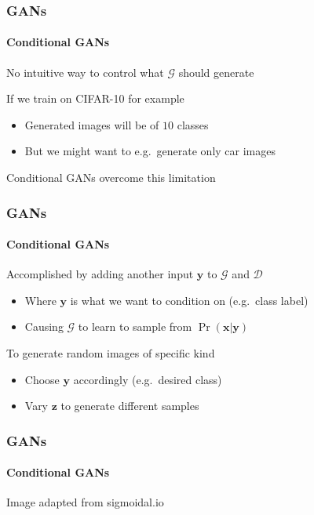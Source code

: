 \documentclass[xetex,professionalfont]{beamer}
\renewcommand\emph[1]{\textcolor{tuwcvl_cvl_blue}{#1}}
\renewcommand{\vec}[1]{\ensuremath{\mathbf{#1}}}
\newcommand{\vx}{\vec{x}}
\newcommand{\vy}{\vec{y}}
\newcommand{\vz}{\vec{z}}
\newcommand{\cD}{\mathcal{D}}
\newcommand{\cG}{\mathcal{G}}
\begin{document}
\begin{frame}
	\frametitle{GANs}
	\framesubtitle{Conditional GANs}

	No intuitive way to control what $\cG$ should generate

	\bigskip

	If we train on CIFAR-10 for example
	\begin{itemize}
		\item Generated images will be of $10$ classes
		\item But we might want to e.g.~generate only car images
	\end{itemize}

	\bigskip

	\emph{Conditional GANs} overcome this limitation

\end{frame}


\begin{frame}
	\frametitle{GANs}
	\framesubtitle{Conditional GANs}

	Accomplished by adding another input $\vy$ to $\cG$ and $\cD$
	\begin{itemize}
		\item Where $\vy$ is what we want to condition on (e.g.~class label)
		\item Causing $\cG$ to learn to sample from $\Pr(\vx|\vy)$ %
	\end{itemize}

	\bigskip

	To generate random images of specific kind
	\begin{itemize}
		\item Choose $\vy$ accordingly (e.g.~desired class)
		\item Vary $\vz$ to generate different samples
	\end{itemize}

\end{frame}


\begin{frame}
	\frametitle{GANs}
	\framesubtitle{Conditional GANs}

	\begin{center}
		{\centering Image adapted from sigmoidal.io}
	\end{center}

\end{frame}
\end{document}
